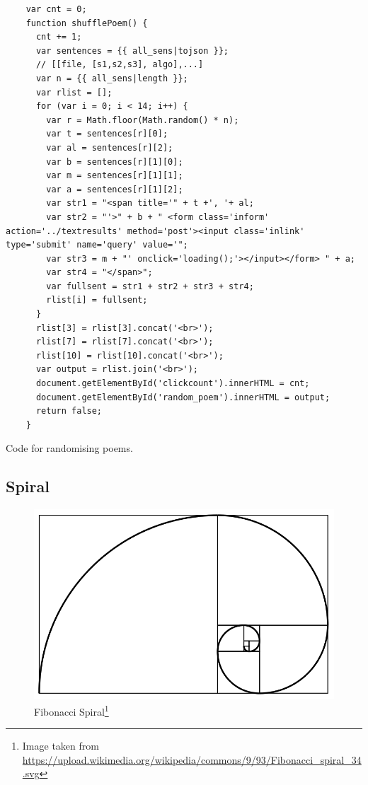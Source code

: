 \begin{listing}[h!]
  \begin{verbatim}
    var cnt = 0;
    function shufflePoem() {
      cnt += 1;
      var sentences = {{ all_sens|tojson }};
      // [[file, [s1,s2,s3], algo],...]
      var n = {{ all_sens|length }};
      var rlist = [];
      for (var i = 0; i < 14; i++) {
        var r = Math.floor(Math.random() * n);
        var t = sentences[r][0];
        var al = sentences[r][2];
        var b = sentences[r][1][0];
        var m = sentences[r][1][1];
        var a = sentences[r][1][2];
        var str1 = "<span title='" + t +', '+ al;
        var str2 = "'>" + b + " <form class='inform' action='../textresults' method='post'><input class='inlink' type='submit' name='query' value='";
        var str3 = m + "' onclick='loading();'></input></form> " + a;
        var str4 = "</span>";
        var fullsent = str1 + str2 + str3 + str4;
        rlist[i] = fullsent;
      }
      rlist[3] = rlist[3].concat('<br>');
      rlist[7] = rlist[7].concat('<br>');
      rlist[10] = rlist[10].concat('<br>');
      var output = rlist.join('<br>');
      document.getElementById('clickcount').innerHTML = cnt;
      document.getElementById('random_poem').innerHTML = output;
      return false;
    }
  \end{verbatim}
\caption{Code for randomising poems.}
\label{code:rpoemsjs}
\end{listing}


\subsection{Spiral}

\begin{figure}[htb] %
  \centering
  \includegraphics[width=0.5\linewidth]{images/Fibonacci}
\caption[Fibonacci Spiral]{Fibonacci Spiral\footnote{Image taken from \url{https://upload.wikimedia.org/wikipedia/commons/9/93/Fibonacci_spiral_34.svg}}}
\label{img:Fibonacci}
\end{figure}


